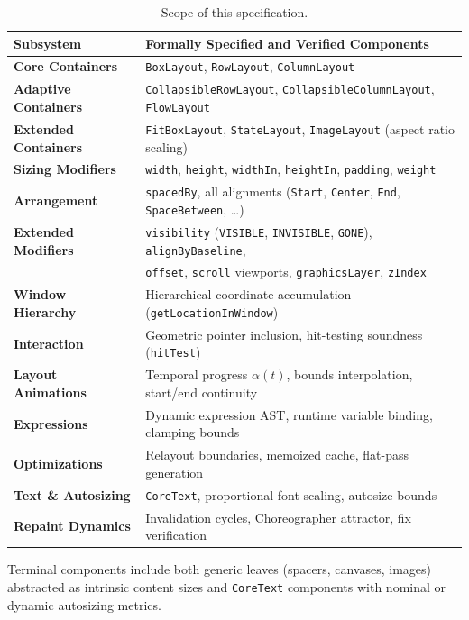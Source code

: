 \documentclass[11pt,a4paper]{article}
\newcommand{\jv}[1]{\texttt{#1}}       %
\theoremstyle{definition}
\theoremstyle{plain}
\theoremstyle{remark}
\begin{document}
\begin{table}[h]
\centering
\small
\begin{tabular}{@{}ll@{}}
\toprule
\textbf{Subsystem} & \textbf{Formally Specified and Verified Components} \\
\midrule
\textbf{Core Containers} & \jv{BoxLayout}, \jv{RowLayout}, \jv{ColumnLayout} \\
\textbf{Adaptive Containers} & \jv{CollapsibleRowLayout}, \jv{CollapsibleColumnLayout}, \jv{FlowLayout} \\
\textbf{Extended Containers} & \jv{FitBoxLayout}, \jv{StateLayout}, \jv{ImageLayout} (aspect ratio scaling) \\
\textbf{Sizing Modifiers} & \jv{width}, \jv{height}, \jv{widthIn}, \jv{heightIn}, \jv{padding}, \jv{weight} \\
\textbf{Arrangement} & \jv{spacedBy}, all alignments (\jv{Start}, \jv{Center}, \jv{End}, \jv{SpaceBetween}, \ldots) \\
\textbf{Extended Modifiers} & \jv{visibility} (\jv{VISIBLE}, \jv{INVISIBLE}, \jv{GONE}), \jv{alignByBaseline}, \\
 & \jv{offset}, \jv{scroll} viewports, \jv{graphicsLayer}, \jv{zIndex} \\
\textbf{Window Hierarchy} & Hierarchical coordinate accumulation (\jv{getLocationInWindow}) \\
\textbf{Interaction} & Geometric pointer inclusion, hit-testing soundness (\jv{hitTest}) \\
\textbf{Layout Animations} & Temporal progress $\alpha(t)$, bounds interpolation, start/end continuity \\
\textbf{Expressions} & Dynamic expression AST, runtime variable binding, clamping bounds \\
\textbf{Optimizations} & Relayout boundaries, memoized cache, flat-pass generation \\
\textbf{Text \& Autosizing} & \jv{CoreText}, proportional font scaling, autosize bounds \\
\textbf{Repaint Dynamics} & Invalidation cycles, Choreographer attractor, fix verification \\
\bottomrule
\end{tabular}
\caption{Scope of this specification.}
\end{table}

Terminal components include both generic leaves (spacers, canvases, images)
abstracted as intrinsic content sizes and \jv{CoreText} components with nominal
or dynamic autosizing metrics.
\end{document}
